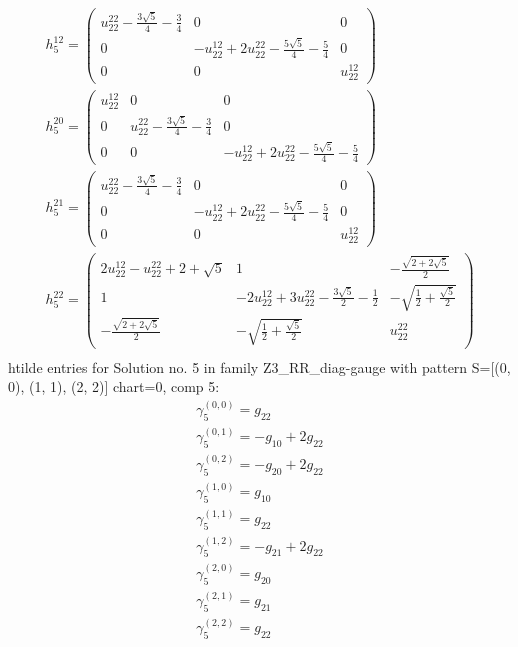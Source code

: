 \documentclass[a4paper, 11pt, twoside, onecolumn]{article}
\begin{document}
\begin{landscape}
\begin{gather*}
	 h_5^{12}=\begin{pmatrix}u^{22}_{22} - \frac{3 \sqrt{5}}{4} - \frac{3}{4} & 0 & 0\\0 & - u^{12}_{22} + 2 u^{22}_{22} - \frac{5 \sqrt{5}}{4} - \frac{5}{4} & 0\\0 & 0 & u^{12}_{22}\end{pmatrix}\\ 
	 h_5^{20}=\begin{pmatrix}u^{12}_{22} & 0 & 0\\0 & u^{22}_{22} - \frac{3 \sqrt{5}}{4} - \frac{3}{4} & 0\\0 & 0 & - u^{12}_{22} + 2 u^{22}_{22} - \frac{5 \sqrt{5}}{4} - \frac{5}{4}\end{pmatrix}\\ 
	 h_5^{21}=\begin{pmatrix}u^{22}_{22} - \frac{3 \sqrt{5}}{4} - \frac{3}{4} & 0 & 0\\0 & - u^{12}_{22} + 2 u^{22}_{22} - \frac{5 \sqrt{5}}{4} - \frac{5}{4} & 0\\0 & 0 & u^{12}_{22}\end{pmatrix}\\ 
	 h_5^{22}=\begin{pmatrix}2 u^{12}_{22} - u^{22}_{22} + 2 + \sqrt{5} & 1 & - \frac{\sqrt{2 + 2 \sqrt{5}}}{2}\\1 & - 2 u^{12}_{22} + 3 u^{22}_{22} - \frac{3 \sqrt{5}}{2} - \frac{1}{2} & - \sqrt{\frac{1}{2} + \frac{\sqrt{5}}{2}}\\- \frac{\sqrt{2 + 2 \sqrt{5}}}{2} & - \sqrt{\frac{1}{2} + \frac{\sqrt{5}}{2}} & u^{22}_{22}\end{pmatrix}\\ 
\end{gather*} 
htilde entries for Solution no. 5 in family Z3_RR_diag-gauge with pattern S=[(0, 0), (1, 1), (2, 2)] chart=0, comp 5: 
\begin{gather*} 
	 \gamma^{(0, 0)}_5=g_{22}\\ 
	 \gamma^{(0, 1)}_5=- g_{10} + 2 g_{22}\\ 
	 \gamma^{(0, 2)}_5=- g_{20} + 2 g_{22}\\ 
	 \gamma^{(1, 0)}_5=g_{10}\\ 
	 \gamma^{(1, 1)}_5=g_{22}\\ 
	 \gamma^{(1, 2)}_5=- g_{21} + 2 g_{22}\\ 
	 \gamma^{(2, 0)}_5=g_{20}\\ 
	 \gamma^{(2, 1)}_5=g_{21}\\ 
	 \gamma^{(2, 2)}_5=g_{22}\\ 

\end{gather*}
\end{landscape}
\end{document}
